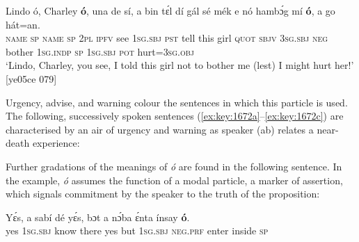 \ea%
    \label{ex:key:1671}
    \gll Lindo  ó,  Charley  \textbf{ó},  una  de  sí,  a    bin  tɛ́l  dí  gál  sé
mék  e    nó  hambɔ́g  mí    \textbf{ó},  a    go  hát=an.\\
\textsc{name}  \textsc{sp}  \textsc{name}  \textsc{sp}  \textsc{2pl}  \textsc{ipfv}  see  \textsc{1sg.sbj}  \textsc{pst}  tell  this  girl  \textsc{quot}
\textsc{sbjv}  \textsc{3sg.sbj}  \textsc{neg}  bother  \textsc{1sg.indp}  \textsc{sp}  \textsc{1sg.sbj}  \textsc{pot}  hurt=\textsc{3sg.obj}\\

\glt ‘Lindo, Charley, you see, I told this girl not to bother me (lest) I might 
hurt her!’ [ye05ce 079]
\z

Urgency, advise, and warning colour the sentences in which this particle is used. The following, successively spoken sentences (\ref{ex:key:1672a}–\ref{ex:key:1672c}) are characterised by an air of urgency and warning as speaker (ab) relates a near-death experience:


\ea%
    \label{ex:key:1672}
\z\z

Further gradations of the meanings of \textit{ó} are found in the following sentence. In the example, \textit{ó} assumes the function of a modal particle, a marker of assertion, which signals commitment by the speaker to the truth of the proposition:


\ea%
    \label{ex:key:1673}
    \gll Yɛ́s,  a    sabí    dé    yɛ́s,  bɔt  a    nɔ́ba  ɛ́nta    ínsay  \textbf{ó}.\\
yes  \textsc{1sg.sbj}  know  there  yes  but  \textsc{1sg.sbj}  \textsc{neg}.\textsc{prf}  enter  inside  \textsc{sp}\\

